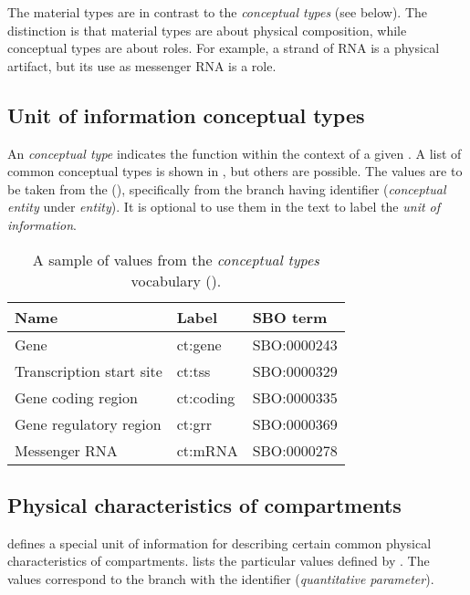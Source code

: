 The material types are in contrast to the \emph{conceptual types} (see below).  The distinction is that material types are about physical composition, while conceptual types are about roles.  For example, a strand of RNA is a physical artifact, but its use as messenger RNA is a role.

\subsection{Unit of information conceptual types}
\label{sec:af:conceptual-types-cv}

An  \emph{conceptual type} indicates the function within the context of a given \AF.  A list of common conceptual types is shown in , but others are possible.  The values are to be taken from the \sbo (\sbourl), specifically from the branch having identifier  ($\!$\emph{conceptual entity} under \emph{entity}). It is optional to use them in the text to label the \emph{unit of information}. 

\begin{table}[h]
  \centering
  \begin{tabular}{l>{\ttfamily}l>{\ttfamily}l}
    \toprule
    \textbf{Name}              & \textbf{\rmfamily Label} & \textbf{\rmfamily SBO term} \\
    \midrule
    Gene                      & ct:gene   & SBO:0000243\\
    Transcription start site  & ct:tss    & SBO:0000329\\
    Gene coding region        & ct:coding & SBO:0000335\\
    Gene regulatory region    & ct:grr    & SBO:0000369\\
    Messenger RNA             & ct:mRNA   & SBO:0000278\\
    \bottomrule
  \end{tabular}
  \caption{A sample of values from the \emph{conceptual types} vocabulary
    ().}
  \label{tab:af:conceptual-types-cv}
\end{table}

\subsection{Physical characteristics of compartments}
\label{sec:af:physical-characteristics-cv}

\SBGNAFLone defines a special unit of information for describing certain common physical characteristics of compartments.   lists the particular values defined by \SBGNAFLone.  The values correspond to the \sbo branch with the identifier  (\emph{quantitative parameter}).

